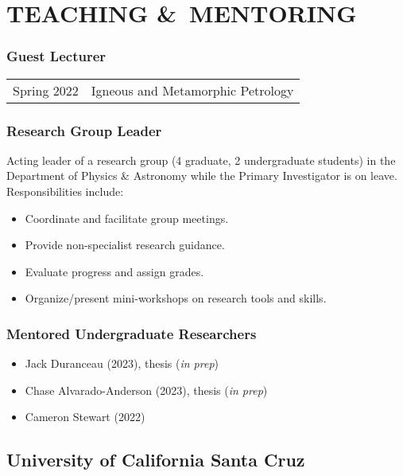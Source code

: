 \section*{TEACHING \&\ MENTORING}
\subsubsection*{Guest Lecturer}
\begin{tabular}{p{.15\linewidth} p{.85\linewidth}} %
Spring 2022 & Igneous and Metamorphic Petrology
\end{tabular}

\subsubsection*{Research Group Leader }
Acting leader of a research group (4 graduate, 2 undergraduate students) in the Department of Physics \& Astronomy while the Primary Investigator is on leave. Responsibilities include:
\begin{itemize}
\item Coordinate and facilitate group meetings.
\item Provide non-specialist research guidance.
\item Evaluate progress and assign grades.
\item Organize/present mini-workshops on research tools and skills.
\end{itemize}

\subsubsection*{Mentored Undergraduate Researchers}
\begin{itemize}
	\item Jack Duranceau (2023), thesis (\textit{in prep})
	\item Chase Alvarado-Anderson (2023), thesis (\textit{in prep})
	\item Cameron Stewart (2022)
\end{itemize}

\subsection*{\textbf{University of California Santa Cruz}}
